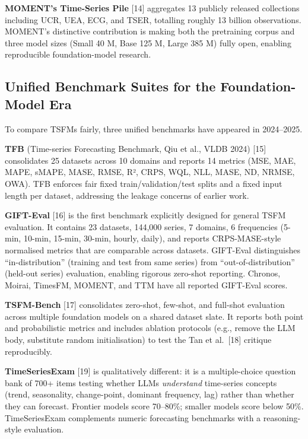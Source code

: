 \documentclass{article}
\begin{document}
\textbf{MOMENT's Time-Series Pile} {[}14{]} aggregates 13 publicly released collections including UCR, UEA, ECG, and TSER, totalling roughly 13 billion observations. MOMENT's distinctive contribution is making both the pretraining corpus and three model sizes (Small 40 M, Base 125 M, Large 385 M) fully open, enabling reproducible foundation-model research.

\subsection{Unified Benchmark Suites for the Foundation-Model Era}\label{unified-benchmark-suites-for-the-foundation-model-era}

To compare TSFMs fairly, three unified benchmarks have appeared in 2024--2025.

\textbf{TFB} (Time-series Forecasting Benchmark, Qiu et al., VLDB 2024) {[}15{]} consolidates 25 datasets across 10 domains and reports 14 metrics (MSE, MAE, MAPE, sMAPE, MASE, RMSE, R², CRPS, WQL, NLL, MASE, ND, NRMSE, OWA). TFB enforces fair fixed train/validation/test splits and a fixed input length per dataset, addressing the leakage concerns of earlier work.

\textbf{GIFT-Eval} \citep{aksu2024giftevalabenchmark} {[}16{]} is the first benchmark explicitly designed for general TSFM evaluation. It contains 23 datasets, 144,000 series, 7 domains, 6 frequencies (5-min, 10-min, 15-min, 30-min, hourly, daily), and reports CRPS-MASE-style normalised metrics that are comparable across datasets. GIFT-Eval distinguishes ``in-distribution'' (training and test from same series) from ``out-of-distribution'' (held-out series) evaluation, enabling rigorous zero-shot reporting. Chronos, Moirai, TimesFM, MOMENT, and TTM have all reported GIFT-Eval scores.

\textbf{TSFM-Bench} \citep{li2025tsfmbenchacomprehe} {[}17{]} consolidates zero-shot, few-shot, and full-shot evaluation across multiple foundation models on a shared dataset slate. It reports both point and probabilistic metrics and includes ablation protocols (e.g., remove the LLM body, substitute random initialisation) to test the Tan et al.~{[}18{]} critique reproducibly.

\textbf{TimeSeriesExam} \citep{cai2024timeseriesexamatim} {[}19{]} is qualitatively different: it is a multiple-choice question bank of 700+ items testing whether LLMs \emph{understand} time-series concepts (trend, seasonality, change-point, dominant frequency, lag) rather than whether they can forecast. Frontier models score 70--80\%; smaller models score below 50\%. TimeSeriesExam complements numeric forecasting benchmarks with a reasoning-style evaluation.
\end{document}
